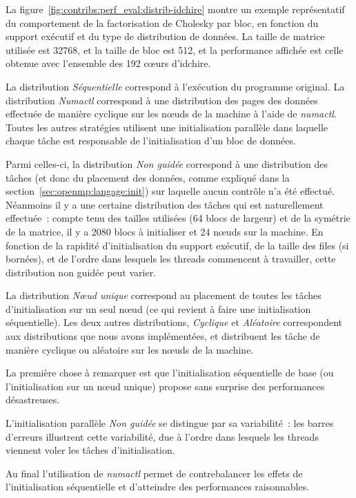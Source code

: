 La figure~\ref{fig:contribs:perf_eval:distrib-idchire} montre un exemple représentatif du comportement de la factorisation de Cholesky par bloc, en fonction du support exécutif et du type de distribution de données. La taille de matrice utilisée est 32768, et la taille de bloc est 512, et la performance affichée est celle obtenue avec l'ensemble des 192 cœurs d'idchire.

La distribution \emph{Séquentielle} correspond à l'exécution du programme original.
La distribution \emph{Numactl} correspond à une distribution des pages des données effectuée de manière cyclique sur les nœuds de la machine à l'aide de \emph{numactl}.
Toutes les autres stratégies utilisent une initialisation parallèle dans laquelle chaque tâche est responsable de l'initialisation d'un bloc de données.

Parmi celles-ci, la distribution \emph{Non guidée} correspond à une distribution des tâches (et donc du placement des données, comme expliqué dans la section~\ref{sec:openmp:langage:init}) sur laquelle aucun contrôle n'a été effectué.
Néanmoins il y a une certaine distribution des tâches qui est naturellement effectuée~: compte tenu des tailles utilisées (64 blocs de largeur) et de la symétrie de la matrice, il y a 2080 blocs à initialiser et 24 nœuds sur la machine. En fonction de la rapidité d'initialisation du support exécutif, de la taille des files (si bornées), et de l'ordre dans lesquels les threads commencent à travailler, cette distribution non guidée peut varier.

La distribution \emph{Nœud unique} correspond au placement de toutes les tâches d'initialisation sur un seul nœud (ce qui revient à faire une initialisation séquentielle).
Les deux autres distributions, \emph{Cyclique} et \emph{Aléatoire} correspondent aux distributions que nous avons implémentées, et distribuent les tâche de manière cyclique ou aléatoire sur les nœuds de la machine.

La première chose à remarquer est que l'initialisation séquentielle de base (ou l'initialisation sur un nœud unique) propose sans surprise des performances désastreuses.

L'initialisation parallèle \emph{Non guidée} se distingue par sa variabilité~: les barres d'erreurs illustrent cette variabilité, due à l'ordre dans lesquels les threads viennent voler les tâches d'initialisation.

Au final l'utilisation de \emph{numactl} permet de contrebalancer les effets de l'initialisation séquentielle et d'atteindre des performances raisonnables.

